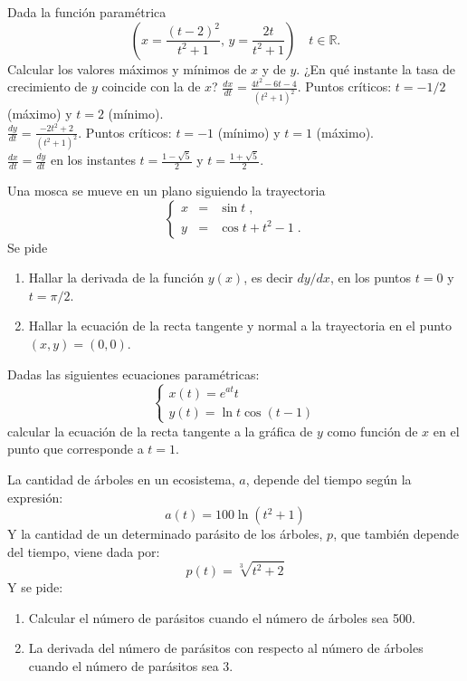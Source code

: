 { Dada la función paramétrica
\[
\left(
x =\frac{(t-2)^2}{t^2+1},\, y=\frac{2t}{t^2+1}
\right)
\quad t\in \mathbb{R}.
\]
Calcular los valores máximos y mínimos de $x$ y de $y$.
¿En qué instante la tasa de crecimiento de $y$ coincide con la de $x$?
}
{$\frac{dx}{dt}=\frac{4t^2-6t-4}{(t^2+1)^2}$. Puntos críticos: $t=-1/2$ (máximo) y $t=2$ (mínimo).\\
$\frac{dy}{dt}=\frac{-2t^2+2}{(t^2+1)^2}$. Puntos críticos: $t=-1$ (mínimo) y $t=1$ (máximo).\\
$\frac{dx}{dt}=\frac{dy}{dt}$ en los instantes $t=\frac{1-\sqrt 5}{2}$ y $t=\frac{1+\sqrt 5}{2}$.
}
{
}


{Una mosca se mueve en un plano siguiendo la trayectoria
\[
\left\{
\begin{array}{lll}
x & = & \sin t
\; ,
\\
y & = & \cos t + t^2 - 1
\; .
\end{array}
\right.
\]
Se pide
\begin{enumerate}
\item Hallar la derivada de la función $y(x)$, es decir $dy/dx$,
en los puntos $t=0$ y $t=\pi/2$.
\item Hallar la ecuación de la recta tangente y normal a la trayectoria
en el punto $(x,y)=(0,0)$.
\end{enumerate}
}


{Dadas las siguientes ecuaciones paramétricas:
\[
\left\{
\begin{array}{l}
x(t)=e^{at}t \\
y(t)=\ln t\cos (t-1)
\end{array}
\right.
\]
calcular la ecuación de la recta tangente a la gráfica de $y$ como función de $x$ en el punto que corresponde a $t=1$.
}


{La cantidad de árboles en un ecosistema, $a$, depende del tiempo según la expresión:
\[
a(t)=100\ln(t^2+1)
\]
Y la cantidad de un determinado parásito de los árboles, $p$, que también depende del tiempo, viene dada por:
\[
p(t) = \sqrt[3]{{t^2  + 2}}
\]
Y se pide:
\begin{enumerate}
\item Calcular el número de parásitos cuando el número de árboles sea 500.
\item La derivada del número de parásitos con respecto al número de árboles cuando el número de parásitos sea 3.
\end{enumerate}
}


